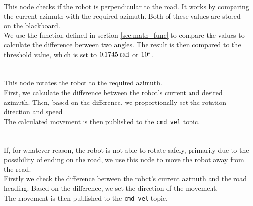     \\
        This node checks if the robot is perpendicular to the road. It works by comparing the current azimuth with the required azimuth. Both of these values are stored on the blackboard.\\
        We use the function defined in section \ref{sec:math_func} to compare the values to calculate the difference between two angles. The result is then compared to the threshold value, which is set to $0.1745\:\rm{rad}$ or $10\rm{^{\circ}}$.\\\\
    \\
        This node rotates the robot to the required azimuth.\\
        First, we calculate the difference between the robot's current and desired azimuth. Then, based on the difference, we proportionally set the rotation direction and speed.\\
        The calculated movement is then published to the \texttt{cmd\_vel} topic.\\\\
    \\
        If, for whatever reason, the robot is not able to rotate safely, primarily due to the possibility of ending on the road, we use this node to move the robot away from the road.\\
        Firstly we check the difference between the robot's current azimuth and the road heading. Based on the difference, we set the direction of the movement.\\
        The movement is then published to the \texttt{cmd\_vel} topic.

